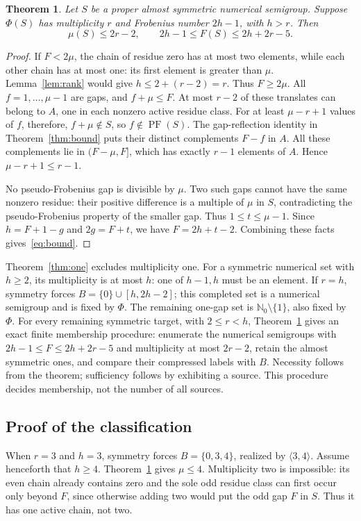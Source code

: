 \documentclass[11pt,a4paper]{article}
\newtheorem{theorem}{Theorem}
\theoremstyle{definition}
\theoremstyle{remark}
\newcommand{\N}{\mathbb{N}_0}
\newcommand{\PF}{\operatorname{PF}}
\begin{document}
\begin{theorem}\label{thm:cutoff}
Let $S$ be a proper almost symmetric numerical semigroup. Suppose $\Phi(S)$ has multiplicity $r$ and Frobenius number $2h-1$,
with $h>r$. Then
\begin{equation}\label{eq:bound}
 \mu(S)\leq2r-2,\qquad
 2h-1\leq F(S)\leq2h+2r-5.
\end{equation}
\end{theorem}
\begin{proof}
If $F<2\mu$, the chain of residue zero has at most two elements, while
each other chain has at most one: its first element is greater than $\mu$.
Lemma~\ref{lem:rank} would give $h\leq2+(r-2)=r$. Thus $F\geq2\mu$.
All $f=1,\ldots,\mu-1$ are gaps, and $f+\mu\leq F$.
At most $r-2$ of these translates can belong to $A$, one in each nonzero
active residue class. For at least $\mu-r+1$ values of $f$, therefore,
$f+\mu\notin S$, so $f\notin\PF(S)$. The gap-reflection identity in
Theorem~\ref{thm:bound} puts their distinct complements $F-f$ in $A$.
All these complements lie in $(F-\mu,F]$, which has exactly $r-1$
elements of $A$. Hence $\mu-r+1\leq r-1$.

No pseudo-Frobenius gap is divisible by $\mu$. Two such gaps cannot
have the same nonzero residue: their positive difference is a multiple
of $\mu$ in $S$, contradicting the pseudo-Frobenius property of the
smaller gap. Thus $1\leq t\leq\mu-1$.
Since $h=F+1-g$ and $2g=F+t$, we have $F=2h+t-2$.
Combining these facts gives~\eqref{eq:bound}.
\end{proof}

Theorem~\ref{thm:one} excludes multiplicity one. For a symmetric numerical set with $h\geq2$, its multiplicity is at most
$h$: one of $h-1,h$ must be an element. If $r=h$, symmetry forces
$B=\{0\}\cup[h,2h-2]$; this completed set is a numerical semigroup
and is fixed by $\Phi$. The remaining one-gap set is
$\N\setminus\{1\}$, also fixed by $\Phi$.
For every remaining symmetric target, with $2\leq r<h$, Theorem~\ref{thm:cutoff} gives
an exact finite membership procedure: enumerate the numerical semigroups
with $2h-1\leq F\leq2h+2r-5$ and multiplicity at most $2r-2$, retain
the almost symmetric ones, and compare their compressed labels with $B$.
Necessity follows from the theorem; sufficiency follows by exhibiting a
source. This procedure decides membership, not the number of all sources.


\subsection{Proof of the classification}\label{sec:three-proof}
When $r=3$ and $h=3$, symmetry forces $B=\{0,3,4\}$, realized by
$\langle3,4\rangle$. Assume henceforth that $h\geq4$.
Theorem~\ref{thm:cutoff} gives $\mu\leq4$. Multiplicity two is impossible:
its even chain already contains zero and the sole odd residue class
can first occur only beyond $F$, since otherwise adding two would put the
odd gap $F$ in $S$. Thus it has one active chain, not two.
\end{document}
